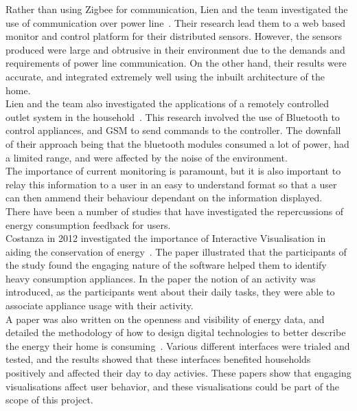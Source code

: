 \documentclass[preprint,12pt,3p]{elsarticle}
\begin{document}
Rather than using Zigbee for communication, Lien and the team investigated the use of communication over power line~\cite{lien2008power}. Their research lead them to a web based monitor and control platform for their distributed sensors. However, the sensors produced were large and obtrusive in their environment due to the demands and requirements of power line communication. On the other hand, their results were accurate, and integrated extremely well using the inbuilt architecture of the home. \\
Lien and the team also investigated the applications of a remotely controlled outlet system in the household~\cite{lien2006remotely}. This research involved the use of Bluetooth to control appliances, and GSM to send commands to the controller. The downfall of their approach being that the bluetooth modules consumed a lot of power, had a limited range, and were affected by the noise of the environment.\\
The importance of current monitoring is paramount, but it is also important to relay this information to a user in an easy to understand format so that a user can then ammend their behaviour dependant on the information displayed.\\
There have been a number of studies that have investigated the repercussions of energy consumption feedback for users.\\
Costanza in 2012 investigated the importance of Interactive Visualisation in aiding the conservation of energy~\cite{costanza2012understanding}. The paper illustrated that the participants of the study found the engaging nature of the software helped them to identify heavy consumption appliances. In the paper the notion of an activity was introduced, as the participants went about their daily tasks, they were able to associate appliance usage with their activity. \\
A paper was also written on the openness and visibility of energy data, and detailed the methodology of how to design digital technologies to better describe the energy their home is consuming~\cite{price2013looking}. Various different interfaces were trialed and tested, and the results showed that these interfaces benefited households positively and affected their day to day activies.
These papers show that engaging visualisations affect user behavior, and these visualisations could be part of the scope of this project.\\
\end{document}
